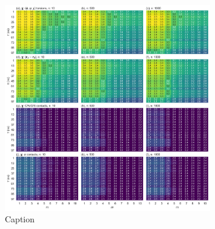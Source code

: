 \begin{figure}
    \centering
    \includegraphics[width=0.8\textwidth]{chapters/msm_optimization/figures/aadh_response_surface_d.png}
    \caption{Caption}
    \label{fig:asdafadf}
\end{figure}

